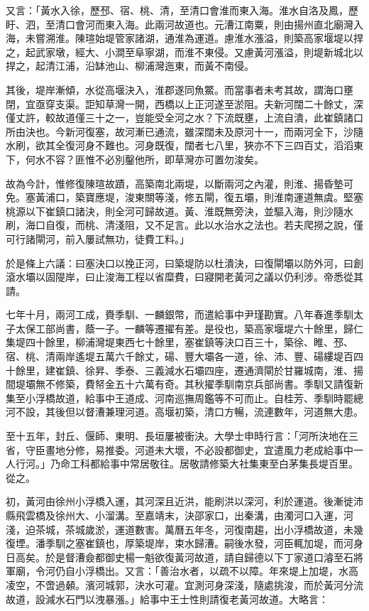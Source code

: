 又言：「黃水入徐，歷邳、宿、桃、清，至清口會淮而東入海。淮水自洛及鳳，歷盱、泗，至清口會河而東入海。此兩河故道也。元漕江南粟，則由揚州直北廟灣入海，未嘗溯淮。陳瑄始堤管家諸湖，通淮為運道。慮淮水漲溢，則築高家堰堤以捍之，起武家墩，經大、小澗至阜寧湖，而淮不東侵。又慮黃河漲溢，則堤新城北以捍之，起清江浦，沿缽池山、柳浦灣迤東，而黃不南侵。

其後，堤岸漸傾，水從高堰決入，淮郡遂同魚鱉。而當事者未考其故，謂海口壅閉，宜亟穿支渠。詎知草灣一開，西橋以上正河遂至淤阻。夫新河闊二十餘丈，深僅丈許，較故道僅三十之一，豈能受全河之水？下流既壅，上流自潰，此崔鎮諸口所由決也。今新河復塞，故河漸已通流，雖深闊未及原河十一，而兩河全下，沙隨水刷，欲其全復河身不難也。河身既復，闊者七八里，狹亦不下三四百丈，滔滔東下，何水不容？匪惟不必別鑿他所，即草灣亦可置勿浚矣。

故為今計，惟修復陳瑄故蹟，高築南北兩堤，以斷兩河之內灌，則淮、揚昏墊可免。塞黃浦口，築寶應堤，浚東關等淺，修五閘，復五壩，則淮南運道無虞。堅塞桃源以下崔鎮口諸決，則全河可歸故道。黃、淮既無旁決，並驅入海，則沙隨水刷，海口自復，而桃、清淺阻，又不足言。此以水治水之法也。若夫爬撈之說，僅可行諸閘河，前入屢試無功，徒費工料。」

於是條上六議：曰塞決口以挽正河，曰築堤防以杜潰決，曰復閘壩以防外河，曰創滾水壩以固隄岸，曰止浚海工程以省糜費，曰寢開老黃河之議以仍利涉。帝悉從其請。

七年十月，兩河工成，賚季馴、一麟銀幣，而遣給事中尹瑾勘實。八年春進季馴太子太保工部尚書，蔭一子。一麟等遷擢有差。是役也，築高家堰堤六十餘里，歸仁集堤四十餘里，柳浦灣堤東西七十餘里，塞崔鎮等決口百三十，築徐、睢、邳、宿、桃、清兩岸遙堤五萬六千餘丈，碭、豐大壩各一道，徐、沛、豐、碭縷堤百四十餘里，建崔鎮、徐昇、季泰、三義減水石壩四座，遷通濟閘於甘羅城南，淮、揚間堤壩無不修築，費帑金五十六萬有奇。其秋擢季馴南京兵部尚書。季馴又請復新集至小浮橋故道，給事中王道成、河南巡撫周鑑等不可而止。自桂芳、季馴時罷總河不設，其後但以督漕兼理河道。高堰初築，清口方暢，流連數年，河道無大患。

至十五年，封丘、偃師、東明、長垣屢被衝決。大學士申時行言：「河所決地在三省，守臣畫地分修，易推委。河道未大壞，不必設都御史，宜遣風力老成給事中一人行河。」乃命工科都給事中常居敬往。居敬請修築大社集東至白茅集長堤百里。從之。

初，黃河由徐州小浮橋入運，其河深且近洪，能刷洪以深河，利於運道。後漸徙沛縣飛雲橋及徐州大、小溜溝。至嘉靖末，決邵家口，出秦溝，由濁河口入運，河淺，迫茶城，茶城歲淤，運道數害。萬曆五年冬，河復南趨，出小浮橋故道，未幾復堙。潘季馴之塞崔鎮也，厚築堤岸，束水歸漕。嗣後水發，河臣輒加堤，而河身日高矣。於是督漕僉都御史楊一魁欲復黃河故道，請自歸德以下丁家道口濬至石將軍廟，令河仍自小浮橋出。又言：「善治水者，以疏不以障。年來堤上加堤，水高凌空，不啻過顙。濱河城郭，決水可灌。宜測河身深淺，隨處挑浚，而於黃河分流故道，設減水石門以洩暴漲。」給事中王士性則請復老黃河故道。大略言：

